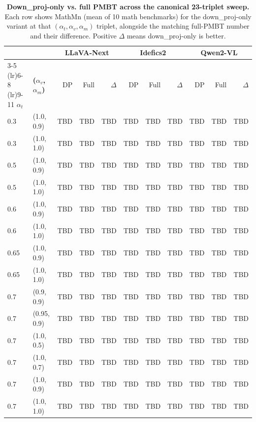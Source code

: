 \begin{table}[t]
\centering
\small
\caption{\textbf{Down\_proj-only vs. full PMBT across the canonical 23-triplet sweep.}
Each row shows MathMn (mean of 10 math benchmarks) for the down\_proj-only variant
at that $(\alpha_t, \alpha_v, \alpha_m)$ triplet, alongside the matching full-PMBT
number and their difference. Positive $\Delta$ means down\_proj-only is better.}
\label{tab:downproj-sweep}
\begin{tabular}{l l rrr rrr rrr}
\toprule
                 &                      & \multicolumn{3}{c}{\textbf{LLaVA-Next}} & \multicolumn{3}{c}{\textbf{Idefics2}} & \multicolumn{3}{c}{\textbf{Qwen2-VL}} \\
                                        \cmidrule(lr){3-5} \cmidrule(lr){6-8} \cmidrule(lr){9-11}
\textbf{$\alpha_t$} & \textbf{($\alpha_v$, $\alpha_m$)}
                 & DP & Full & $\Delta$ & DP & Full & $\Delta$ & DP & Full & $\Delta$ \\
\midrule
0.3   & (1.0, 0.9)   & TBD & TBD & TBD & TBD & TBD & TBD & TBD & TBD & TBD \\
0.3   & (1.0, 1.0)   & TBD & TBD & TBD & TBD & TBD & TBD & TBD & TBD & TBD \\
0.5   & (1.0, 0.9)   & TBD & TBD & TBD & TBD & TBD & TBD & TBD & TBD & TBD \\
0.5   & (1.0, 1.0)   & TBD & TBD & TBD & TBD & TBD & TBD & TBD & TBD & TBD \\
0.6   & (1.0, 0.9)   & TBD & TBD & TBD & TBD & TBD & TBD & TBD & TBD & TBD \\
0.6   & (1.0, 1.0)   & TBD & TBD & TBD & TBD & TBD & TBD & TBD & TBD & TBD \\
0.65  & (1.0, 0.9)   & TBD & TBD & TBD & TBD & TBD & TBD & TBD & TBD & TBD \\
0.65  & (1.0, 1.0)   & TBD & TBD & TBD & TBD & TBD & TBD & TBD & TBD & TBD \\
0.7   & (0.9, 0.9)   & TBD & TBD & TBD & TBD & TBD & TBD & TBD & TBD & TBD \\
0.7   & (0.95, 0.9)  & TBD & TBD & TBD & TBD & TBD & TBD & TBD & TBD & TBD \\
0.7   & (1.0, 0.5)   & TBD & TBD & TBD & TBD & TBD & TBD & TBD & TBD & TBD \\
0.7   & (1.0, 0.7)   & TBD & TBD & TBD & TBD & TBD & TBD & TBD & TBD & TBD \\
0.7   & (1.0, 0.9)   & TBD & TBD & TBD & TBD & TBD & TBD & TBD & TBD & TBD \\
0.7   & (1.0, 1.0)   & TBD & TBD & TBD & TBD & TBD & TBD & TBD & TBD & TBD \\

\end{tabular}
\end{table}
